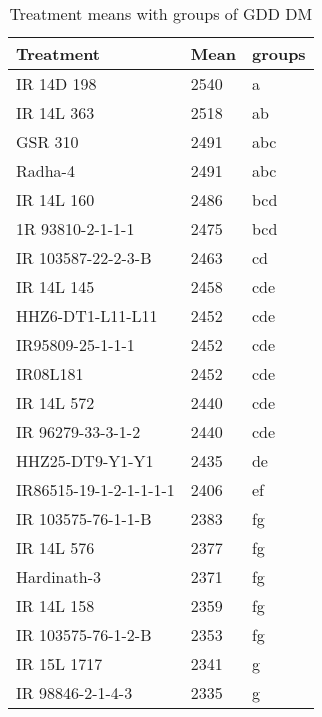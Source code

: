 \documentclass[]{article}
\begin{document}
\endgroup{}
\begingroup\fontsize{12}{14}\selectfont

\begin{longtable}{lll}
\caption{\label{tab:two-fac-groups-tab-agroclimate-early}Treatment means with groups of GDD DM}\\
\toprule
Treatment & Mean & groups\\
\midrule
\rowcolor{gray!6}  IR 14D 198 & 2540 & a\\
IR 14L 363 & 2518 & ab\\
\rowcolor{gray!6}  GSR 310 & 2491 & abc\\
Radha-4 & 2491 & abc\\
\rowcolor{gray!6}  IR 14L 160 & 2486 & bcd\\
\addlinespace
1R 93810-2-1-1-1 & 2475 & bcd\\
\rowcolor{gray!6}  IR 103587-22-2-3-B & 2463 & cd\\
IR 14L 145 & 2458 & cde\\
\rowcolor{gray!6}  HHZ6-DT1-L11-L11 & 2452 & cde\\
IR95809-25-1-1-1 & 2452 & cde\\
\addlinespace
\rowcolor{gray!6}  IR08L181 & 2452 & cde\\
IR 14L 572 & 2440 & cde\\
\rowcolor{gray!6}  IR 96279-33-3-1-2 & 2440 & cde\\
HHZ25-DT9-Y1-Y1 & 2435 & de\\
\rowcolor{gray!6}  IR86515-19-1-2-1-1-1-1 & 2406 & ef\\
\addlinespace
IR 103575-76-1-1-B & 2383 & fg\\
\rowcolor{gray!6}  IR 14L 576 & 2377 & fg\\
Hardinath-3 & 2371 & fg\\
\rowcolor{gray!6}  IR 14L 158 & 2359 & fg\\
IR 103575-76-1-2-B & 2353 & fg\\
\addlinespace
\rowcolor{gray!6}  IR 15L 1717 & 2341 & g\\
IR 98846-2-1-4-3 & 2335 & g\\
\bottomrule
\end{longtable}
\endgroup{}
\begingroup\fontsize{12}{14}\selectfont
\end{document}
